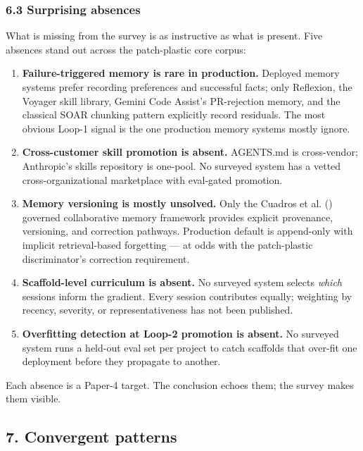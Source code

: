 \documentclass[
]{article}
\providecommand{\tightlist}{%
  \setlength{\itemsep}{0pt}\setlength{\parskip}{0pt}}
\begin{document}
\subsubsection{6.3 Surprising absences}\label{surprising-absences}

What is missing from the survey is as instructive as what is present.
Five absences stand out across the patch-plastic core corpus:

\begin{enumerate}
\def\labelenumi{\arabic{enumi}.}
\tightlist
\item
  \textbf{Failure-triggered memory is rare in production.} Deployed
  memory systems prefer recording preferences and successful facts; only
  Reflexion, the Voyager skill library, Gemini Code Assist's
  PR-rejection memory, and the classical SOAR chunking pattern
  explicitly record residuals. The most obvious Loop-1 signal is the one
  production memory systems mostly ignore.
\item
  \textbf{Cross-customer skill promotion is absent.} AGENTS.md is
  cross-vendor; Anthropic's skills repository is one-pool. No surveyed
  system has a vetted cross-organizational marketplace with eval-gated
  promotion.
\item
  \textbf{Memory versioning is mostly unsolved.} Only the Cuadros et al.
  () governed collaborative
  memory framework provides explicit provenance, versioning, and
  correction pathways. Production default is append-only with implicit
  retrieval-based forgetting --- at odds with the patch-plastic
  discriminator's correction requirement.
\item
  \textbf{Scaffold-level curriculum is absent.} No surveyed system
  selects \emph{which} sessions inform the gradient. Every session
  contributes equally; weighting by recency, severity, or
  representativeness has not been published.
\item
  \textbf{Overfitting detection at Loop-2 promotion is absent.} No
  surveyed system runs a held-out eval set per project to catch
  scaffolds that over-fit one deployment before they propagate to
  another.
\end{enumerate}

Each absence is a Paper-4 target. The conclusion echoes them; the survey
makes them visible.

\subsection{7. Convergent patterns}\label{convergent-patterns}
\end{document}
